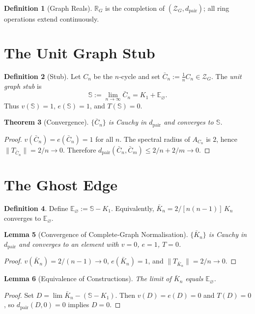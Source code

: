 \documentclass[11pt]{article}
\theoremstyle{definition}
\newtheorem{definition}{Definition}[section]
\theoremstyle{plain}
\newtheorem{theorem}[definition]{Theorem}
\newtheorem{lemma}[definition]{Lemma}
\theoremstyle{remark}
\newcommand{\stub}{\mathbb S}
\newcommand{\ghost}{\mathbb E_{\varnothing}}
\begin{document}
\begin{definition}[Graph Reals]
$\mathbb R_G$ is the completion of $(\mathcal Z_G,d_{\mathrm{pair}})$; all ring operations extend continuously.
\end{definition}

\section{The Unit Graph Stub}

\begin{definition}[Stub]
Let $C_n$ be the $n$‑cycle and set $\bar C_n := \tfrac1n C_n\in\mathcal Z_G$.  The \emph{unit graph stub} is
\[
  \stub := \lim_{n\to\infty} \bar C_n = K_1 + \ghost.
\]
Thus $v(\stub)=1$, $e(\stub)=1$, and $T(\stub)=0$.
\end{definition}

\begin{theorem}[Convergence]
$\{\bar C_n\}$ is Cauchy in $d_{\mathrm{pair}}$ and converges to $\stub$.
\end{theorem}
\begin{proof}
$v(\bar C_n)=e(\bar C_n)=1$ for all $n$.  The spectral radius of $A_{C_n}$ is $2$, hence $\|T_{\bar C_n}\|=2/n\to0$.  Therefore $d_{\mathrm{pair}}(\bar C_n,\bar C_m)\le 2/n+2/m\to0$.
\end{proof}

\section{The Ghost Edge}

\begin{definition}
Define $\ghost := \stub - K_1$.  Equivalently, $\bar K_n = 2/[n(n-1)]\,K_n$ converges to $\ghost$.
\end{definition}

\begin{lemma}[Convergence of Complete‐Graph Normalisation]
$\{\bar K_n\}$ is Cauchy in $d_{\mathrm{pair}}$ and converges to an element with $v=0$, $e=1$, $T=0$.
\end{lemma}
\begin{proof}
$v(\bar K_n)=2/(n-1)\to0$, $e(\bar K_n)=1$, and $\|T_{\bar K_n}\|=2/n\to0$.
\end{proof}

\begin{lemma}[Equivalence of Constructions]
The limit of $\bar K_n$ equals $\ghost$.
\end{lemma}
\begin{proof}
Set $D = \lim\bar K_n - (\stub - K_1)$.  Then $v(D)=e(D)=0$ and $T(D)=0$, so $d_{\mathrm{pair}}(D,0)=0$ implies $D=0$.
\end{proof}
\end{document}
